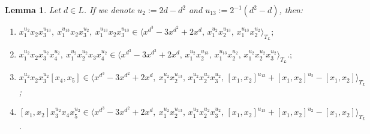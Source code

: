 \documentclass[a4paper,reqno]{amsart}
\newtheorem{lemma}[theorem]{Lemma}
\theoremstyle{definition}
\numberwithin{equation}{section}
\numberwithin{theorem}{section}
\begin{document}
\begin{lemma}\label{lem: UT_3^e1+e2 cons var in the mid}
    Let $d\in L$. If we denote $u_{2}:=2d -d^2$ and $u_{13}:=2^{-1}(d^2 - d)$, then:
    \begin{enumerate}
        \item $x_1^{u_{2}} x_2x_3^{u_{13}}, \ x_1^{u_{13}} x_2x_3^{u_{2}}, \ x_1^{u_{13}}x_2x_3^{u_{13}} \in \langle x^{d^3}-3x^{d^2}+2x^{d},\, x_1^{u_{2}}x_2^{u_{13}}, \, x_1^{u_{13}}x_2^{u_{2}}\rangle_{T_L};$
    \vspace{1mm}
    \item   $x_1^{u_{2}} x_2 x_3^{u_{2}}x_4^{u_{2}}, \ x_1^{u_{2}} x_2^{u_{2}}x_3x_4^{u_{2}}\in \langle x^{d^3}-3x^{d^2}+2x^{d},\, x_1^{u_{2}}x_2^{u_{13}}, \, x_1^{u_{13}}x_2^{u_{2}},\, x_1^{u_{2}} x_2^{u_{2}}x_3^{u_{2}}\rangle_{T_L}.;$
    \vspace{1mm}
    \item $x_1^{u_{2}} x_2 x_3^{u_{2}}[x_4,x_5]\in \langle x^{d^3}-3x^{d^2}+2x^{d},\ x_1^{u_{2}}x_2^{u_{13}}, \, x_1^{u_{2}} x_2^{u_{2}}x_3^{u_{2}}, \, [x_1,x_2]^{u_{13}}+ [x_1,x_2]^{u_{2}} - [x_1,x_2] \rangle_{T_L}$;
    \vspace{1mm}
        \item $[x_1, x_2]x_3^{u_{2}}x_4x_5^{u_{2}} \in \langle x^{d^3}-3x^{d^2}+2x^{d},\ x_1^{u_{2}}x_2^{u_{13}}, \, x_1^{u_{2}} x_2^{u_{2}}x_3^{u_{2}}, \, [x_1,x_2]^{u_{13}}+ [x_1,x_2]^{u_{2}} - [x_1,x_2] \rangle_{T_L}$.
    \end{enumerate}
\end{lemma}
\end{document}
